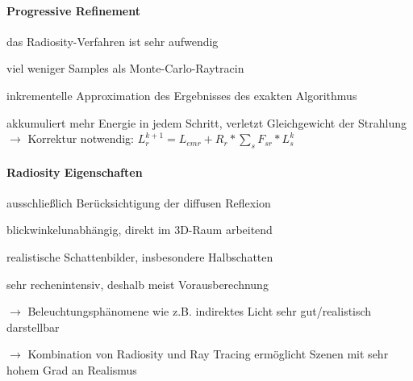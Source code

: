 \documentclass[landscape]{article}
\begin{document}
\begin{multicols}{3}
  \paragraph{Progressive Refinement}
  \begin{itemize*}
    \item das Radiosity-Verfahren ist sehr aufwendig
    \item viel weniger Samples als Monte-Carlo-Raytracin
    \item inkrementelle Approximation des Ergebnisses des exakten Algorithmus
    \item akkumuliert mehr Energie in jedem Schritt, verletzt Gleichgewicht der Strahlung $\rightarrow$ Korrektur notwendig:
    $L_r^{k+1}=L_{emr} + R_r*\sum_s F_{sr}* L_s^k$
  \end{itemize*}
  
  \paragraph{Radiosity Eigenschaften}
  \begin{itemize*}
    \item ausschließlich Berücksichtigung der diffusen Reflexion
    \item blickwinkelunabhängig, direkt im 3D-Raum arbeitend
    \item realistische Schattenbilder, insbesondere Halbschatten
    \item sehr rechenintensiv, deshalb meist Vorausberechnung
    \item $\rightarrow$ Beleuchtungsphänomene wie z.B. indirektes Licht sehr gut/realistisch darstellbar
    \item $\rightarrow$ Kombination von Radiosity und Ray Tracing ermöglicht Szenen mit sehr hohem Grad an Realismus
  \end{itemize*}
  
\end{multicols}
\newpage
\end{document}
